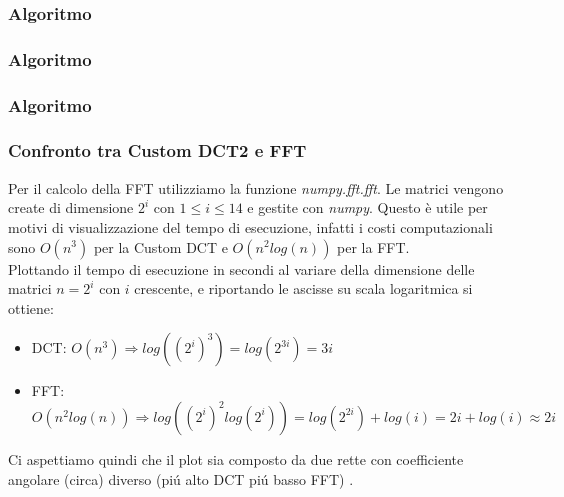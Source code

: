 \documentclass{beamer}
\begin{document}
\begin{frame}
\frametitle{Algoritmo}
	
\end{frame}

\begin{frame}
\frametitle{Algoritmo}
	
\end{frame}

\begin{frame}
\frametitle{Algoritmo}
	
\end{frame}

\begin{frame}
	\frametitle{Confronto tra Custom DCT2 e FFT}
	Per il calcolo della FFT utilizziamo la funzione \textit{numpy.fft.fft}. Le matrici vengono create di dimensione $2^i$ con $1\leq i \leq 14$ e gestite con \textit{numpy}. Questo è utile per motivi di visualizzazione del tempo di esecuzione, infatti i costi computazionali sono $O(n^3)$ per la Custom DCT e $O(n^2log(n))$ per la FFT.\\
	Plottando il tempo di esecuzione in secondi al variare della dimensione delle matrici $n = 2^i$ con $i$ crescente, e riportando le ascisse su scala logaritmica si ottiene:\\
	\begin{itemize}
		\item DCT: $O(n^3) \Rightarrow log((2^i)^3) =  log(2^{3i}) = 3i $
		\item FFT: $O(n^2log(n)) \Rightarrow log((2^i)^2 log(2^i)) =  log(2^{2i}) + log(i) = 2i + log(i) \approx 2i$
	\end{itemize}
	Ci aspettiamo quindi che il plot sia composto da due rette con coefficiente angolare (circa) diverso (pi\'u alto DCT pi\'u basso FFT) .
\end{frame}
\end{document}
